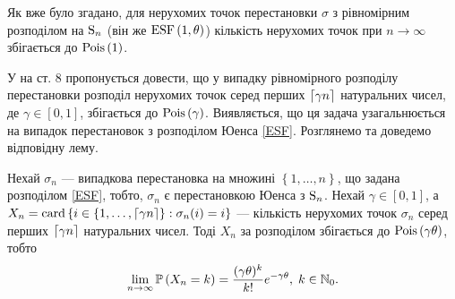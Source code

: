 Як вже було згадано, для нерухомих точок перестановки $\sigma$ з рівномірним
розподілом на $\Sym{n}$ (він же $\ESF{1, \theta}$) кількість нерухомих точок 
при $n\to\infty$ збігається до $\Poiss{1}$. 

У \cite{last_penrose_2017} на ст. 8 пропонується довести, що у випадку рівномірного розподілу перестановки
розподіл нерухомих точок серед перших $\ceil*{\gamma n}$ натуральних чисел, де
$\gamma \in [0, 1]$, збігається до $\Poiss{\gamma}$.
Виявляється, що ця задача узагальнюється на випадок перестановок
з розподілом Юенса \eqref{ESF}. Розглянемо та доведемо відповідну лему.

\begin{lemma}\label{main_lemma}
    Нехай $\sigma_n$ --- випадкова перестановка на множині
    $\left\{1, \dots, n\right\}$, що задана розподілом \eqref{ESF},
    тобто, $\sigma_n$ є перестановкою Юенса з $\Sym{n}$.
    Нехай $\gamma \in [0, 1]$, а
    $X_n = \card\left\{i\in \left\{1,\dots,\ceil*{\gamma n} \right\} : \sigma_n(i) = i\right\}$
    --- кількість нерухомих точок
    $\sigma_n$ серед перших $\ceil*{\g n}$ натуральних чисел.
    Тоді $X_n$ за розподілом збігається до $\Poiss{\gamma\theta}$, тобто
    \begin{gather}
        \lim_{n\to\infty} \P{X_n = k} = \frac{(\gamma\theta)^k}{k!}e^{-\gamma\theta}, \; k \in \N_0.
    \end{gather} 
\end{lemma}
